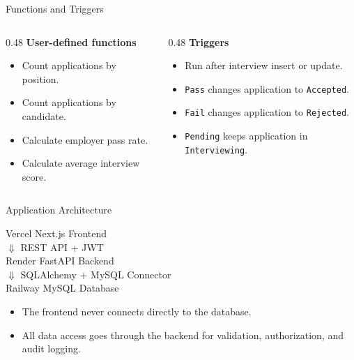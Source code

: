 \documentclass[aspectratio=169]{beamer}
\begin{document}
\begin{frame}{Functions and Triggers}
  \begin{columns}[T,onlytextwidth]
    \begin{column}{0.48\textwidth}
      \textbf{User-defined functions}
      \begin{itemize}
        \item Count applications by position.
        \item Count applications by candidate.
        \item Calculate employer pass rate.
        \item Calculate average interview score.
      \end{itemize}
    \end{column}
    \begin{column}{0.48\textwidth}
      \textbf{Triggers}
      \begin{itemize}
        \item Run after interview insert or update.
        \item \texttt{Pass} changes application to \texttt{Accepted}.
        \item \texttt{Fail} changes application to \texttt{Rejected}.
        \item \texttt{Pending} keeps application in \texttt{Interviewing}.
      \end{itemize}
    \end{column}
  \end{columns}
\end{frame}

\begin{frame}{Application Architecture}
  \begin{center}
    \Large
    Vercel Next.js Frontend\\[0.7em]
    $\Downarrow$ REST API + JWT\\[0.7em]
    Render FastAPI Backend\\[0.7em]
    $\Downarrow$ SQLAlchemy + MySQL Connector\\[0.7em]
    Railway MySQL Database
  \end{center}
  \vspace{0.4em}
  \begin{itemize}
    \item The frontend never connects directly to the database.
    \item All data access goes through the backend for validation, authorization, and audit logging.
  \end{itemize}
\end{frame}
\end{document}
